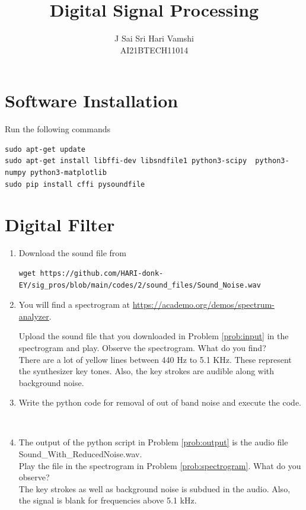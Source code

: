 \documentclass[journal,12pt,twocolumn]{IEEEtran}
\renewcommand\thesection{\arabic{section}}
\begin{document}
\title{\LARGE{Digital Signal Processing}}
\author{\normalsize J Sai Sri Hari Vamshi\\ \footnotesize AI21BTECH11014}
\date{}
\maketitle
\tableofcontents
\renewcommand{\thefigure}{\theenumi}
\renewcommand{\thetable}{\theenumi}
\bigskip

\section{Software Installation}
Run the following commands
\begin{lstlisting}
sudo apt-get update
sudo apt-get install libffi-dev libsndfile1 python3-scipy  python3-numpy python3-matplotlib 
sudo pip install cffi pysoundfile 
\end{lstlisting}


\section{Digital Filter}
\begin{enumerate}[label=\thesection.\arabic*,ref=\thesection.\theenumi]

\item
\label{prob:input}
Download the sound file from  
\begin{lstlisting}
wget https://github.com/HARI-donk-EY/sig_pros/blob/main/codes/2/sound_files/Sound_Noise.wav
\end{lstlisting}

\item
\label{prob:spectrogram}
You will find a spectrogram at \href{https://academo.org/demos/spectrum-analyzer}{\url{https://academo.org/demos/spectrum-analyzer}}.

Upload the sound file that you downloaded in Problem \ref{prob:input} in the spectrogram  and play. Observe the spectrogram. What do you find?
\\
%
\solution There are a lot of yellow lines between 440 Hz to 5.1 KHz. These represent the synthesizer key tones. Also, the key strokes
are audible along with background noise.\\

\item
\label{prob:output}
Write the python code for removal of out of band noise and execute the code.
\\
\solution

\ \\


\item
The output of the python script in Problem \ref{prob:output} is the audio file Sound\_With\_ReducedNoise.wav. \\Play the file in the spectrogram in Problem \ref{prob:spectrogram}. What do you observe?
\\
\solution The key strokes as well as background noise is subdued in the audio.  Also,  the signal is blank for frequencies above 5.1 kHz.

\end{enumerate}
\end{document}
